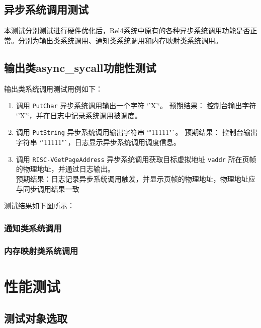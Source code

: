 \subsection{异步系统调用测试}

本测试分别测试进行硬件优化后，Rel4系统中原有的各种异步系统调用功能是否正常。分别为输出类系统调用、通知类系统调用和内存映射类系统调用。



\subsection{输出类async\_sycall功能性测试}

输出类系统调用测试用例如下：

\begin{enumerate}
  \item 调用 \texttt{PutChar} 异步系统调用输出一个字符 `'X'`。
        预期结果： 控制台输出字符 `'X'`，并在日志中记录系统调用被调度。

  \item 调用 \texttt{PutString} 异步系统调用输出字符串 `"11111"`。
        预期结果： 控制台输出字符串 `"11111"`，日志显示异步系统调用调度信息。
  \item 调用 \texttt{RISC-VGetPageAddress} 异步系统调用获取目标虚拟地址 \texttt{vaddr} 所在页帧的物理地址，并通过日志输出。\\
        预期结果：日志记录异步系统调用触发，并显示页帧的物理地址，物理地址应与同步调用结果一致
\end{enumerate}

测试结果如下图所示：

\subsubsection{通知类系统调用}



\subsubsection{内存映射类系统调用}





\section{性能测试}

\subsection{测试对象选取}

